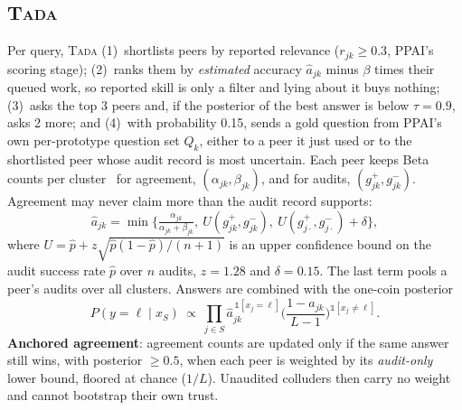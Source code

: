 \documentclass[conference]{IEEEtran}
\newcommand{\tada}{\textup{\textsc{Tada}}}
\begin{document}
\subsection{\tada{}}
Per query, \tada{}
(1)~shortlists peers by reported relevance ($r_{jk}\ge0.3$, PPAI's scoring stage);
(2)~ranks them by \emph{estimated} accuracy $\hat a_{jk}$ minus $\beta$ times their queued work, so
reported skill is only a filter and lying about it buys nothing;
(3)~asks the top 3 peers and, if the posterior of the best answer is below $\tau=0.9$, asks 2 more; and
(4)~with probability 0.15, sends a gold question from PPAI's own per-prototype question set $Q_k$,
either to a peer it just used or to the shortlisted peer whose audit record is most uncertain.
Each peer keeps Beta counts per cluster~\cite{betarep} for agreement, $(\alpha_{jk},\beta_{jk})$,
and for audits, $(g^+_{jk},g^-_{jk})$. Agreement may never claim more than the audit record supports:
\begin{equation}
\hat a_{jk}=\min\Big\{\tfrac{\alpha_{jk}}{\alpha_{jk}+\beta_{jk}},\ U(g^+_{jk},g^-_{jk}),\ U(g^+_{j\cdot},g^-_{j\cdot})+\delta\Big\},
\end{equation}
where $U=\hat p+z\sqrt{\hat p(1-\hat p)/(n+1)}$ is an upper confidence bound on the audit success
rate $\hat p$ over $n$ audits, $z=1.28$ and $\delta=0.15$. The last term pools a peer's audits over
all clusters. Answers are combined with the one-coin posterior
\begin{equation}
P(y=\ell\mid x_S)\ \propto\ \prod_{j\in S}\hat a_{jk}^{\,\mathbb{1}[x_j=\ell]}\Big(\frac{1-\hat a_{jk}}{L-1}\Big)^{\mathbb{1}[x_j\neq\ell]}.
\end{equation}
\textbf{Anchored agreement}: agreement counts are updated only if the same answer still wins, with
posterior $\ge0.5$, when each peer is weighted by its \emph{audit-only} lower bound, floored at
chance ($1/L$). Unaudited colluders then carry no weight and cannot bootstrap their own trust.
\end{document}
